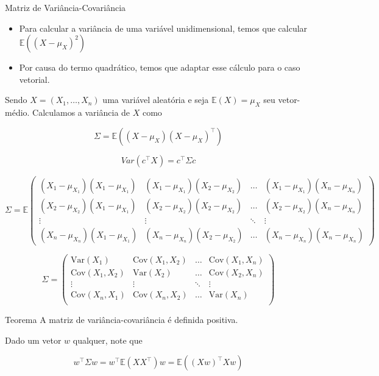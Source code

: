 \documentclass[
  ignorenonframetext,
  aspectratio=169,
]{beamer}
\providecommand{\tightlist}{%
  \setlength{\itemsep}{0pt}\setlength{\parskip}{0pt}}
\newcommand{\EE}{\mathbb{E}}
\begin{document}
\begin{frame}{Matriz de Variância-Covariância}
\begin{itemize}
\tightlist
\item
  Para calcular a variância de uma variável unidimensional, temos que
  calcular \(\EE((X-\mu_X)^2)\)
\item
  Por causa do termo quadrático, temos que adaptar esse cálculo para o
  caso vetorial.
\end{itemize}

Sendo \(X = (X_1,\ldots,X_n)\) uma variável aleatória e seja
\(\EE(X) = \mu_X\) seu vetor-médio. Calculamos a variância de
\(X\) como

\[\Sigma = \EE((X-\mu_X)(X-\mu_X)^\top)\]

\[Var(c^\top X) = c^\top\Sigma c\]
\end{frame}

\begin{frame}
\[\Sigma = \EE\begin{pmatrix}  
(X_1 -\mu_{X_1})(X_1 -\mu_{X_1}) & (X_1 -\mu_{X_1})(X_2 -\mu_{X_2}) & \ldots &  (X_1 -\mu_{X_1})(X_n -\mu_{X_n}) \\
(X_2 -\mu_{X_2})(X_1 -\mu_{X_1}) & (X_2 -\mu_{X_2})(X_2 -\mu_{X_2}) & \ldots &  (X_2 -\mu_{X_2})(X_n -\mu_{X_n}) \\
\vdots & \vdots  & \ddots & \vdots \\
(X_n -\mu_{X_n})(X_1 -\mu_{X_1}) & (X_n -\mu_{X_n})(X_2 -\mu_{X_2}) & \ldots & (X_n -\mu_{X_n})(X_n -\mu_{X_n})
\end{pmatrix}\]
\end{frame}

\begin{frame}
\[\Sigma = \begin{pmatrix}  
\text{Var}(X_1) & \text{Cov}(X_1,X_2) & \ldots & \text{Cov}(X_1,X_n)\\
\text{Cov}(X_1,X_2) & \text{Var}(X_2) & \ldots & \text{Cov}(X_2,X_n)\\
\vdots & \vdots  & \ddots & \vdots \\
\text{Cov}(X_n,X_1) & \text{Cov}(X_n,X_2) & \ldots & \text{Var}(X_n)\\
\end{pmatrix}\]
\end{frame}

\begin{frame}
\begin{block}{Teorema}
A matriz de variância-covariância é definida positiva.
\end{block}

Dado um vetor \(w\) qualquer, note que

\[w^\top \Sigma w = w^\top\EE(XX^\top)w = \EE((Xw)^\top Xw)\]
\end{frame}
\end{document}
